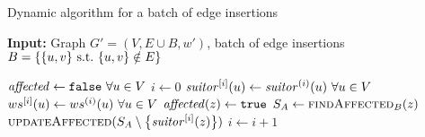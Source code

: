 \begin{algorithm}[t]
\caption{Dynamic \suitor algorithm for a batch of edge insertions}
\label{algo:dyn-suitor-batch-ins}
\textbf{Input:} Graph $G' = (V, E \cup B, w')$, batch of edge insertions
$B = \set{\set{u, v}\ \text{s.t.}\ \set{u, v} \notin E}$

\begin{algorithmic}[1]
\State$\mathit{affected} \gets \texttt{false}\ \forall u \in V$
\State$i \gets 0$
\State$\vsuitor\iteri(u) \gets \vsuitor\interm(u)\ \forall u\in V$
\State$ws^{[i]}(u) \gets ws^{(i)}(u)\ \forall u\in V$
\label{line:dyn-suitor-batch-ins:for-ins}
\label{line:dyn-suitor-batch-ins:if}
\State$\mathit{affected}(z) \gets \texttt{true}$
\State$S_A \gets \textsc{findAffected}_B(z)$
\label{line:dyn-suitor-batch-ins:find-aff-b}
\State$\textsc{updateAffected}(S_A \setminus \set{\vsuitor\iteri(z)})$
\EndFor
\EndIf
\State$i \gets i + 1$
\EndFor
\end{algorithmic}
\end{algorithm}
